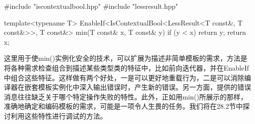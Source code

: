 \begin{cpp}
#include "iscontextualbool.hpp"
#include "lessresult.hpp"

template<typename T>
EnableIf<IsContextualBool<LessResult<T const&, T const&>>,
		T const&>
min(T const& x, T const& y) {
	if (y < x) {
		return y;
	}
	return x;
}
\end{cpp}

这里用于使min()实例化安全的技术，可以扩展为描述非简单模板的需求，方法是将各种需求检查组合到描述某些类型类的特征中，比如前向迭代器，并在EnableIf中组合这些特征。这样做有两个好处，一是可以更好地重载行为，二是可以消除编译器在嵌套模板实例化中深入输出错误时，产生新的错误。另一方面，提供的错误消息往往缺乏关于哪个特定操作失败的特性。此外，正如用min()所展示的那样，准确地确定和编码模板的需求，可能是一项令人生畏的任务。我们将在28.2节中探讨利用这些特性进行调试的方法。





